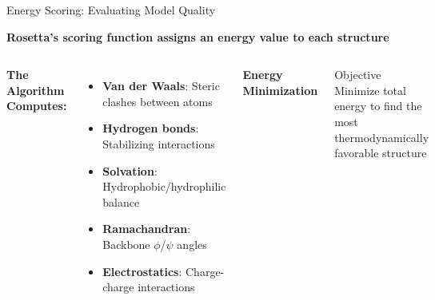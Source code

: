 \documentclass[aspectratio=169,xcolor=table]{beamer}
\begin{document}
\begin{frame}{Energy Scoring: Evaluating Model Quality}

\textbf{Rosetta's scoring function assigns an energy value to each structure}

\vspace{0.2cm}

\begin{columns}
\textbf{The Algorithm Computes:}
\begin{itemize}\setlength{\itemsep}{2pt}
    \item \textbf{Van der Waals}: Steric clashes between atoms
    \item \textbf{Hydrogen bonds}: Stabilizing interactions
    \item \textbf{Solvation}: Hydrophobic/hydrophilic balance
    \item \textbf{Ramachandran}: Backbone $\phi$/$\psi$ angles
    \item \textbf{Electrostatics}: Charge-charge interactions
\end{itemize}

\begin{center}
\textbf{Energy Minimization}
\vspace{0.2cm}

\end{center}

\begin{block}{Objective}
Minimize total energy to find the most thermodynamically favorable structure
\end{block}
\end{columns}

\end{frame}
\end{document}

